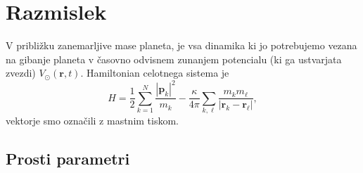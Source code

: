 \documentclass[12pt, a4paper]{article}
\renewcommand{\r}{
    \ensuremath{\mathbf{r}}
}
\newcommand{\p}{
    \ensuremath{\mathbf{p}}
}
\begin{document}
\section{Razmislek}

V pribli\v zku zanemarljive mase planeta, je vsa dinamika ki jo potrebujemo vezana na gibanje planeta
v \v casovno odvisnem zunanjem potencialu (ki ga ustvarjata zvezdi) $V_\odot(\r, t)$. Hamiltonian celotnega
sistema je
\begin{equation}
    H = \frac{1}{2}\sum_{k = 1}^N \frac{|\p_k|^2}{m_k} - \frac{\kappa}{4\pi}\sum_{k,\ell}
        \frac{m_k m_\ell}{|\r_k - \r_\ell|},
    \label{hamilton}
\end{equation}
vektorje smo ozna\v cili z mastnim tiskom.

\subsection{Prosti parametri}
\end{document}
